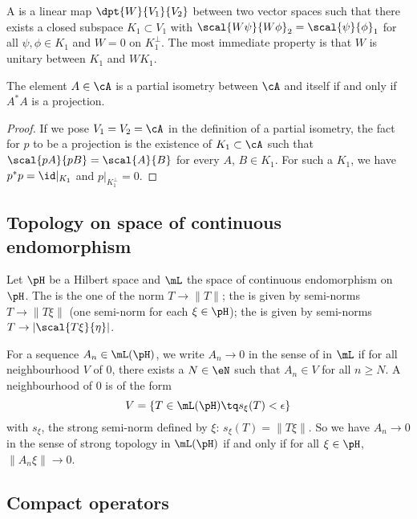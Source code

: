 A  is a linear map $\dpt{ W }{ V_1 }{ V_2 }$ between two vector spaces such that there exists a closed subspace $K_1\subset V_1$ with $\scal{ W\psi }{ W\phi }_2=\scal{ \psi }{ \phi }_1$ for all $\psi,\phi\in K_1$ and $W=0$ on $K_1^{\perp}$. The most immediate property is that $W$ is unitary between $K_1$ and $WK_1$.

\begin{lemma}		\label{LemPartIsomCstar}
The element $A\in\cA$ is a partial isometry between $\cA$ and itself if and only if $A^*A$ is a projection.
\end{lemma}

\begin{proof}
If we pose $V_1=V_2=\cA$ in the definition of a partial isometry, the fact for $p$ to be a projection is the existence of $K_1\subset\cA$ such that $\scal{ pA }{ pB }=\scal{ A }{ B }$ for every $A$, $B\in K_1$. For such a $K_1$, we have $p^*p=\id|_{K_1}$ and $p|_{K_1^{\perp}}=0$.
\end{proof}

\subsection{Topology on space of continuous endomorphism} \label{subsec_topomL}

Let $\pH$ be a Hilbert space and $\mL$ the space of continuous endomorphism on $\pH$. The  is the one of the norm $T\to\| T \|$; the  is given by semi-norms $T\to\| T\xi \|$ (one semi-norm for each $\xi\in\pH$); the  is given by semi-norms $T\to | \scal{ T\xi }{ \eta } |$.

For a sequence $A_n\in\mL(\pH)$, we write $A_n\to 0$ in the sense of  in $\mL$ if for all neighbourhood $V$ of $0$, there exists a $N\in\eN$ such that $A_n\in V$ for all $n\geq N$. A neighbourhood of $0$ is of the form
\[
  V=\{ T\in\mL(\pH)\tq s_{\xi}(T)<\epsilon \}
\]
with $s_{\xi}$, the strong semi-norm defined by $\xi$: $s_{\xi}(T)=\| T\xi \|$. So we have $A_n\to 0$ in the sense of strong topology in $\mL(\pH)$ if and only if for all $\xi\in\pH$, $\| A_n\xi \|\to 0$.

\subsection{Compact operators}


